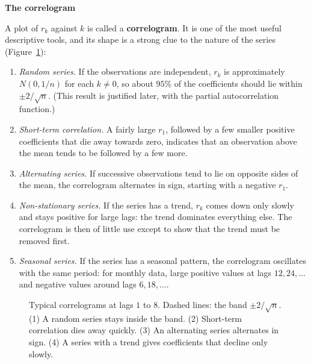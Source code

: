 \documentclass[11pt,a4paper]{article}
\theoremstyle{definition}
\newcommand{\subhead}[1]{%
  \par\medskip\noindent\textbf{#1}\par\nobreak\smallskip}
\begin{document}
\subhead{The correlogram}
A plot of $r_k$ against $k$ is called a \textbf{correlogram}. It is one of the most useful descriptive tools, and
its shape is a strong clue to the nature of the series (Figure~\ref{fig:correlograms}):
\begin{enumerate}
\item \emph{Random series.} If the observations are independent, $r_k$ is approximately $N(0, 1/n)$ for each $k \ne 0$, so about $95\%$
of the coefficients should lie within $\pm2/\sqrt n$. (This result is justified later, with the partial autocorrelation function.)
\item \emph{Short-term correlation.} A fairly large $r_1$, followed by a few smaller positive coefficients that die
away towards zero, indicates that an observation above the mean tends to be followed by a few more.
\item \emph{Alternating series.} If successive observations tend to lie on opposite sides of the mean, the
correlogram alternates in sign, starting with a negative $r_1$.
\item \emph{Non-stationary series.} If the series has a trend, $r_k$ comes down only slowly and stays positive for large
lags: the trend dominates everything else. The correlogram is then of little use except to show that the
trend must be removed first.
\item \emph{Seasonal series.} If the series has a seasonal pattern, the correlogram oscillates with the same period:
for monthly data, large positive values at lags $12, 24, \dots$ and negative values around lags $6, 18, \dots$.
\end{enumerate}

\begin{figure}[H]
\centering
{}
\caption{Typical correlograms at lags $1$ to $8$. Dashed lines: the band $\pm2/\sqrt n$. (1) A random series stays inside
the band. (2) Short-term correlation dies away quickly. (3) An alternating series alternates in sign. (4) A
series with a trend gives coefficients that decline only slowly.}
\label{fig:correlograms}
\end{figure}
\end{document}

